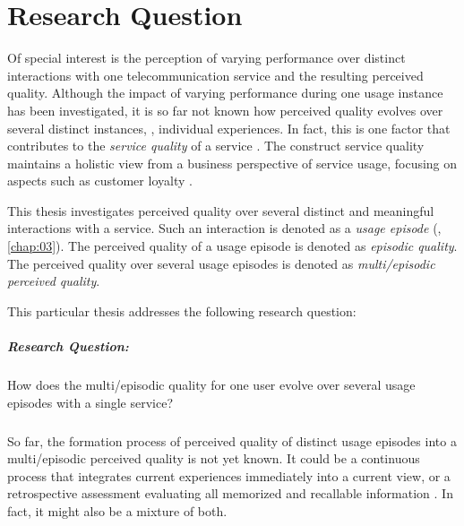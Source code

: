 \section{Research Question}
Of special interest is the perception of varying performance over distinct interactions with one telecommunication service and the resulting perceived quality.
Although the impact of varying performance during one usage instance has been investigated, it is so far not known how perceived quality evolves over several distinct instances, \ie, individual experiences.
In fact, this is one factor that contributes to the \emph{service quality} of a service \citep[][]{berry_quality_1985, zeithaml_behavioral_1996}.
The construct service quality maintains a holistic view from a business perspective of service usage, focusing on aspects such as customer loyalty \citep{parasuraman_conceptual_1985}.

This thesis investigates perceived quality over several distinct and meaningful interactions with a service.
Such an interaction is denoted as a \emph{usage episode} (\cf, \autoref{chap:03}).
The perceived quality of a usage episode is denoted as \emph{episodic quality}.
The perceived quality over several usage episodes is denoted as \emph{multi\-/episodic perceived quality}.

This particular thesis addresses the following research question: 
\subparagraph*{Research Question:}
How does the multi\-/episodic quality for one user evolve over several usage episodes with a single service?

\subparagraph*{}
So far, the formation process of perceived quality of distinct usage episodes into a multi\-/episodic perceived quality is not yet known.
It could be a continuous process that integrates current experiences immediately into a current view, or a retrospective assessment evaluating all memorized and recallable information \citep[][]{hogarth_order_1992}. 
In fact, it might also be a mixture of both.


